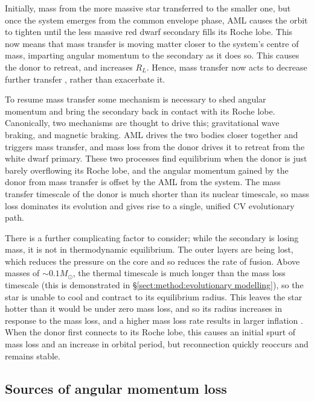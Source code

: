 Initially, mass from the more massive star transferred to the smaller one, but once the system emerges from the common envelope phase, AML causes the orbit to tighten until the less massive red dwarf secondary fills its Roche lobe. This now means that mass transfer is moving matter closer to the system's centre of mass, imparting angular momentum to the secondary as it does so. This causes the donor to retreat, and increases $R_L$. Hence, mass transfer now acts to decrease further transfer \citep{Ritter2008}, rather than exacerbate it.

To resume mass transfer some mechanism is necessary to shed angular momentum and bring the secondary back in contact with its Roche lobe. 
Canonically, two mechanisms are thought to drive this; gravitational wave braking, and magnetic braking.
AML drives the two bodies closer together and triggers mass transfer, and mass loss from the donor drives it to retreat from the white dwarf primary. These two processes find equilibrium when the donor is just barely overflowing its Roche lobe, and the angular momentum gained by the donor from mass transfer is offset by the AML from the system.
The mass transfer timescale of the donor is much shorter than its nuclear timescale, so mass loss dominates its evolution and gives rise to a single, unified CV evolutionary path.

There is a further complicating factor to consider; while the secondary is losing mass, it is not in thermodynamic equilibrium. The outer layers are being lost, which reduces the pressure on the core and so reduces the rate of fusion. 
Above masses of $\sim 0.1 M_\odot$, the thermal timescale is much longer than the mass loss timescale (this is demonstrated in \S\ref{sect:method:evolutionary modelling}), so the star is unable to cool and contract to its equilibrium radius. This leaves the star hotter than it would be under zero mass loss, and so its radius increases in response to the mass loss, and a higher mass loss rate results in larger inflation \citep{knigge2006, knigge11}.
When the donor first connects to its Roche lobe, this causes an initial spurt of mass loss and an increase in orbital period, but reconnection quickly reoccurs and remains stable. 


\subsection{Sources of angular momentum loss}
\label{sect:introduction:AMLMechs}

